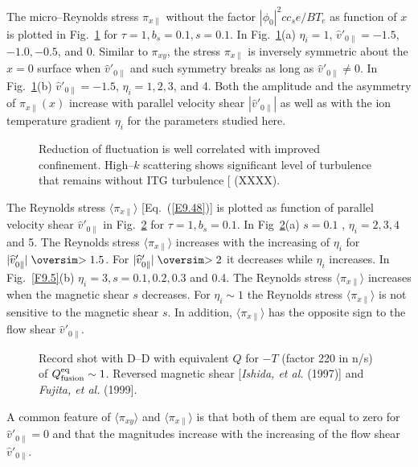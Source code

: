 \documentclass[a4paper,openany,12pt]{book}
\def\nms{\mathsurround=0pt}
\def\gtsim{\mathrel{\mathpalette\oversim>}} %
\def\oversim#1#2{\lower 2pt\vbox{\baselineskip 0pt \lineskip 1pt
    \ialign{$\nms#1\hfil##\hfil$\crcr#2\crcr\sim\crcr}}}
\begin{document}
{The micro--Reynolds stress $\pi_{x\|}$ without the factor $|\phi_0|^2cc_se/BT_e$ as function of $x$ is plotted in Fig.~\ref{F9.40} for $\tau=1, b_s=0.1, s=0.1$. In Fig.~\ref{F9.40}(a) $\eta_i=1$, $\widehat v'_{0\|}=-1.5$, $-1.0, -0.5$, and 0. Similar to $\pi_{xy}$, the stress $\pi_{x\|}$ is inversely symmetric about the $x=0$ surface when $\widehat v'_{0\|}$ and such symmetry breaks as long as $\widehat v'_{0\|}\ne 0$. In Fig.~\ref{F9.40}(b) $\widehat v'_{0\|}=-1.5$, $\eta_i=1,2,3$, and 4. Both the amplitude and the asymmetry of $\pi_{x\|}(x)$ increase with parallel velocity shear $|\widehat v'_{0\|}|$ as well as with the ion temperature gradient $\eta_i$ for the parameters studied here.
%
\begin{figure}[H]
\centerline{}
\centerline{}
\caption{Reduction of fluctuation is well correlated with improved confinement. High--$k$ scattering shows significant level of turbulence that remains without ITG turbulence [\emph{} (XXXX).}
\label{F9.40}
\end{figure}
%
The Reynolds stress $\langle\pi_{x\|}\rangle$ [Eq.~(\ref{E9.48})] is plotted as function of parallel velocity shear $\widehat v'_{0\|}$ in Fig.~\ref{F9.41} for $\tau=1, b_s=0.1$. In Fig~\ref{F9.41}(a) $s=0.1$ , $\eta_i=2,3,4$ and 5. The Reynolds stress $\langle\pi_{x\|}\rangle$ increases with the increasing of $\eta_i$ for $|\widehat v'_{0\|}|\gtsim 1.5$. For 
$|\widehat v'_{0\|}|\gtsim 2$ it decreases while $\eta_i$ increases. In Fig.~\ref{F9.5}(b) $\eta_i=3, s=0.1,0.2,0.3$ and 0.4. The Reynolds stress $\langle\pi_{x\|}\rangle$ increases when the magnetic shear $s$ decreases. For $\eta_i\sim 1$ the Reynolds stress $\langle\pi_{x\|}\rangle$ is not sensitive to the magnetic shear $s$. In addition, $\langle\pi_{x\|}\rangle$ has the opposite sign to the flow shear $\widehat v'_{0\|}$.
%
\begin{figure}[H]
\centerline{}
\caption{Record shot with D--D with equivalent $Q$ for $-T$ (factor 220 in n/s) of $Q^{\rm eq}_{\rm fusion}\sim 1$. Reversed magnetic shear [\emph{Ishida, et al.} (1997)] and \emph{Fujita, et al.} (1999].}
\label{F9.41}
\end{figure}
%
A common feature of $\langle\pi_{xy}\rangle$ and $\langle\pi_{x\|}\rangle$ is that both of them are equal to zero for $\widehat v'_{0\|}=0$ and that the magnitudes increase with the increasing of the flow shear $\widehat v'_{0\|}$.

}
\end{document}
